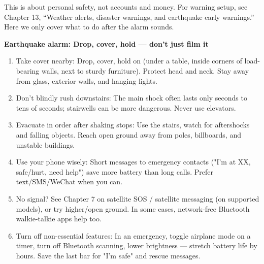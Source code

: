 


This is about personal safety, not accounts and money. For warning setup, see Chapter 13, “Weather alerts, disaster warnings, and earthquake early warnings.” Here we only cover what to do after the alarm sounds.

\textbf{Earthquake alarm: Drop, cover, hold — don't just film it}\par

\begin{enumerate}
  \item Take cover nearby: Drop, cover, hold on (under a table, inside corners of load-bearing walls, next to sturdy furniture). Protect head and neck. Stay away from glass, exterior walls, and hanging lights.
  \item Don't blindly rush downstairs: The main shock often lasts only seconds to tens of seconds; stairwells can be more dangerous. Never use elevators.
  \item Evacuate in order after shaking stops: Use the stairs, watch for aftershocks and falling objects. Reach open ground away from poles, billboards, and unstable buildings.
  \item Use your phone wisely: Short messages to emergency contacts ("I'm at XX, safe/hurt, need help") save more battery than long calls. Prefer text/SMS/WeChat when you can.
  \item No signal? See Chapter 7 on satellite SOS / satellite messaging (on supported models), or try higher/open ground. In some cases, network-free Bluetooth walkie-talkie apps help too.
  \item Turn off non-essential features: In an emergency, toggle airplane mode on a timer, turn off Bluetooth scanning, lower brightness — stretch battery life by hours. Save the last bar for "I'm safe" and rescue messages.
\end{enumerate}


